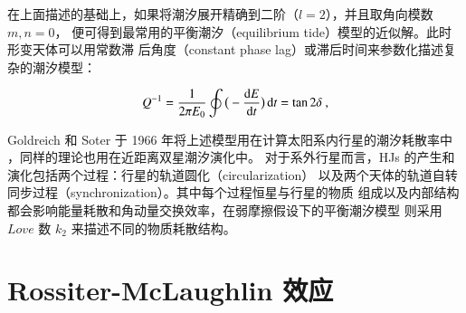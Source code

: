 在上面描述的基础上，如果将潮汐展开精确到二阶（$l=2$），并且取角向模数$m,n = 0 $，
便可得到最常用的平衡潮汐（equilibrium tide）模型的近似解。此时形变天体可以用常数滞
后角度（constant phase lag）或滞后时间来参数化描述复杂的潮汐模型：

\begin{equation} \label{eq:eqtide}
Q^{-1}=\frac{1}{2\pi E_0} \oint \big( -\frac{\mathrm{d} E}{\mathrm{d} t}\big)\,\mathrm{d} t = \tan 2\delta \ ,
\end{equation} %

Goldreich 和 Soter 于 1966 年将上述模型用在计算太阳系内行星的潮汐耗散率中
\cite{Goldreich1966}，同样的理论也用在近距离双星潮汐演化中\cite{Hut1981,Zahn1977}。
对于系外行星而言，HJs 的产生和演化包括两个过程：行星的轨道圆化（circularization）
以及两个天体的轨道自转同步过程（synchronization）。其中每个过程恒星与行星的物质
组成以及内部结构都会影响能量耗散和角动量交换效率，在弱摩擦假设下的平衡潮汐模型
则采用 $Love$ 数 $k_2$ 来描述不同的物质耗散结构。


\section{Rossiter-McLaughlin 效应} \label{sec:rmeffect}

